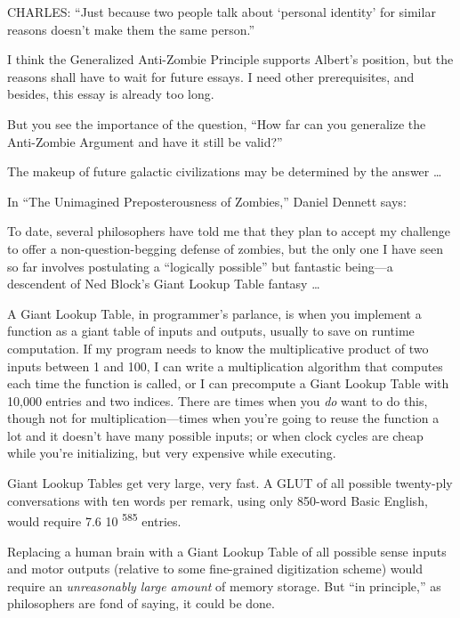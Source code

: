 {
 CHARLES: ``Just because two people talk about
`personal identity' for similar reasons
doesn't make them the same person.''}

{
 I think the Generalized Anti-Zombie Principle supports
Albert's position, but the reasons shall have to wait
for future essays. I need other prerequisites, and besides, this essay
is already too long.}

{
 But you see the importance of the question, ``How
far can you generalize the Anti-Zombie Argument and have it still be
valid?''}

{
 The makeup of future galactic civilizations may be determined by
the answer \ldots}

\myendsectiontext


\bigskip


{
 In ``The Unimagined Preposterousness of
Zombies,'' Daniel Dennett says:}

{
 To date, several philosophers have told me that they plan to
accept my challenge to offer a non-question-begging defense of zombies,
but the only one I have seen so far involves postulating a
``logically possible'' but fantastic
being---a descendent of Ned Block's Giant Lookup Table
fantasy \ldots}

{
 A Giant Lookup Table, in programmer's parlance, is
when you implement a function as a giant table of inputs and outputs,
usually to save on runtime computation. If my program needs to know the
multiplicative product of two inputs between 1 and 100, I can write a
multiplication algorithm that computes each time the function is
called, or I can precompute a Giant Lookup Table with 10,000 entries
and two indices. There are times when you \textit{do} want to do this,
though not for multiplication---times when you're going
to reuse the function a lot and it doesn't have many
possible inputs; or when clock cycles are cheap while
you're initializing, but very expensive while
executing.}

{
 Giant Lookup Tables get very large, very fast. A GLUT of all
possible twenty-ply conversations with ten words per remark, using only
850-word Basic English, would require 7.6 {\texttimes}
10\textsuperscript{ 585} entries.}

{
 Replacing a human brain with a Giant Lookup Table of all possible
sense inputs and motor outputs (relative to some fine-grained
digitization scheme) would require an \textit{unreasonably large
amount} of memory storage. But ``in
principle,'' as philosophers are fond of saying, it
could be done.}

